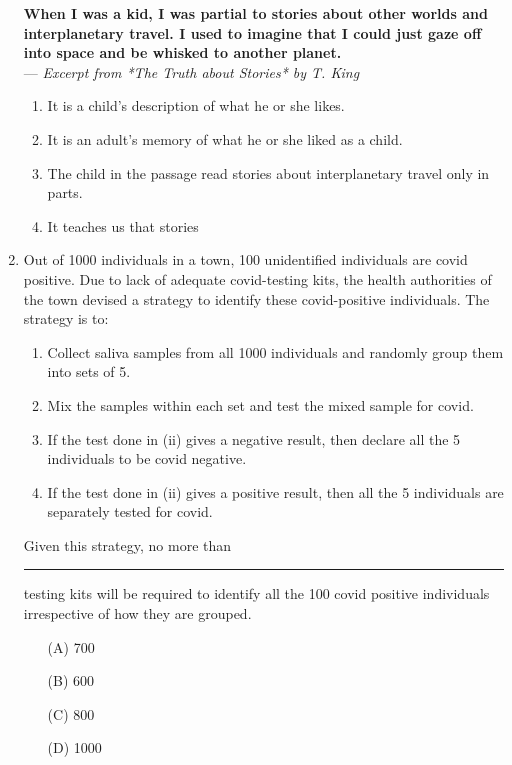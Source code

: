 \documentclass[journal]{IEEEtran}
\begin{document}
\begin{enumerate}
\medskip

\noindent
\textbf{When I was a kid, I was partial to stories about other worlds and interplanetary travel. I used to imagine that I could just gaze off into space and be whisked to another planet.}\\
\hfill --- \textit{Excerpt from *The Truth about Stories* by T. King}

\medskip

\begin{enumerate}
    \item It is a child's description of what he or she likes.
    \item It is an adult's memory of what he or she liked as a child.
    \item The child in the passage read stories about interplanetary travel only in parts.
    \item It teaches us that stories
    \end{enumerate}
    \hfill{}
    
  \item 
Out of 1000 individuals in a town, 100 unidentified individuals are covid positive. Due to lack of adequate covid-testing kits, the health authorities of the town devised a strategy to identify these covid-positive individuals. The strategy is to:

\begin{enumerate}[label=(\roman*)]
    \item Collect saliva samples from all 1000 individuals and randomly group them into sets of 5.
    \item Mix the samples within each set and test the mixed sample for covid.
    \item If the test done in (ii) gives a negative result, then declare all the 5 individuals to be covid negative.
    \item If the test done in (ii) gives a positive result, then all the 5 individuals are separately tested for covid.
\end{enumerate}

Given this strategy, no more than \rule{2cm}{0.15mm} testing kits will be required to identify all the 100 covid positive individuals irrespective of how they are grouped.



\begin{enumerate}
    \item[(A)] 700
    \item[(B)] 600
    \item[(C)] 800
    \item[(D)] 1000
    \end{enumerate}
    \hfill{}
    

\end{enumerate}
\end{document}
